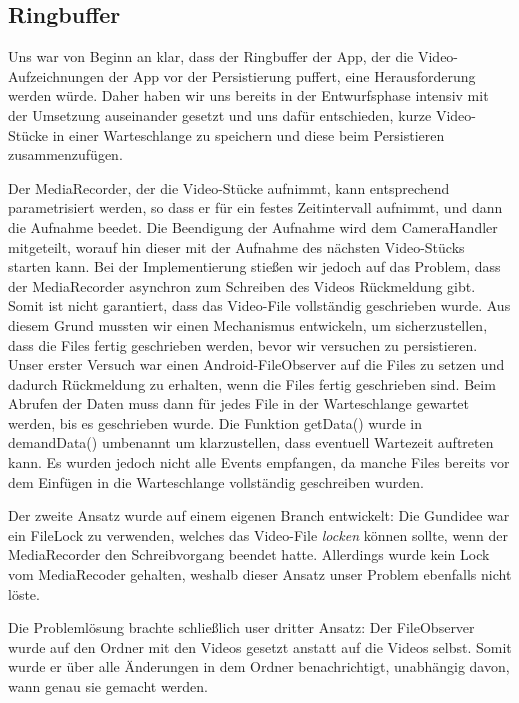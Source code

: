 \subsection{Ringbuffer} \label{Ringbuffer}
Uns war von Beginn an klar, dass der Ringbuffer der App, der die Video-Aufzeichnungen der App vor der Persistierung puffert, eine Herausforderung werden würde. Daher haben wir uns bereits in der Entwurfsphase intensiv mit der Umsetzung auseinander gesetzt und uns dafür entschieden, kurze Video-Stücke in einer Warteschlange zu speichern und diese beim Persistieren zusammenzufügen. \par  
Der MediaRecorder, der die Video-Stücke aufnimmt, kann entsprechend parametrisiert werden, so dass er für ein festes Zeitintervall aufnimmt, und dann die Aufnahme beedet. Die Beendigung der Aufnahme wird dem CameraHandler mitgeteilt, worauf hin dieser mit der Aufnahme des nächsten Video-Stücks starten kann. Bei der Implementierung stießen wir jedoch auf das Problem, dass der MediaRecorder asynchron zum Schreiben des Videos Rückmeldung gibt. Somit ist nicht garantiert, dass das Video-File vollständig geschrieben wurde. Aus diesem Grund mussten wir einen Mechanismus entwickeln, um sicherzustellen, dass die Files fertig geschrieben werden, bevor wir versuchen zu persistieren. 
Unser erster Versuch war einen Android-FileObserver auf die Files zu setzen und dadurch Rückmeldung zu erhalten, wenn die Files fertig geschrieben sind. Beim Abrufen der Daten muss dann für jedes File in der Warteschlange gewartet werden, bis es geschrieben wurde. Die Funktion getData() wurde in demandData() umbenannt um klarzustellen, dass eventuell Wartezeit auftreten kann. Es wurden jedoch nicht alle Events empfangen, da manche Files bereits vor dem Einfügen in die Warteschlange vollständig geschreiben wurden.   \par  
Der zweite Ansatz wurde auf einem eigenen Branch entwickelt: Die Gundidee war ein FileLock zu verwenden, welches das Video-File \textit{locken} können sollte, wenn der MediaRecorder den Schreibvorgang beendet hatte. Allerdings wurde kein Lock vom MediaRecoder gehalten, weshalb dieser Ansatz unser Problem ebenfalls nicht löste. \par
Die Problemlösung brachte schließlich user dritter Ansatz: Der FileObserver wurde auf den Ordner mit den Videos gesetzt anstatt auf die Videos selbst. Somit wurde er über alle Änderungen in dem Ordner benachrichtigt, unabhängig davon, wann genau sie gemacht werden.  \par  

